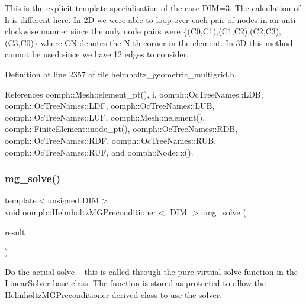 This is the explicit template specialisation of the case D\+IM=3. The calculation of h is different here. In 2D we were able to loop over each pair of nodes in an anti-\/clockwise manner since the only node pairs were \{(C0,C1),(C1,C2),(C2,C3),(C3,C0)\} where CN denotes the N-\/th corner in the element. In 3D this method cannot be used since we have 12 edges to consider. 

Definition at line 2357 of file helmholtz\+\_\+geometric\+\_\+multigrid.\+h.



References oomph\+::\+Mesh\+::element\+\_\+pt(), i, oomph\+::\+Oc\+Tree\+Names\+::\+L\+DB, oomph\+::\+Oc\+Tree\+Names\+::\+L\+DF, oomph\+::\+Oc\+Tree\+Names\+::\+L\+UB, oomph\+::\+Oc\+Tree\+Names\+::\+L\+UF, oomph\+::\+Mesh\+::nelement(), oomph\+::\+Finite\+Element\+::node\+\_\+pt(), oomph\+::\+Oc\+Tree\+Names\+::\+R\+DB, oomph\+::\+Oc\+Tree\+Names\+::\+R\+DF, oomph\+::\+Oc\+Tree\+Names\+::\+R\+UB, oomph\+::\+Oc\+Tree\+Names\+::\+R\+UF, and oomph\+::\+Node\+::x().

\mbox{\label{classoomph_1_1HelmholtzMGPreconditioner_aedd9102297d40354bd8d769ca2c343cb}} 
\subsubsection{\texorpdfstring{mg\+\_\+solve()}{mg\_solve()}}
{\footnotesize\ttfamily template$<$unsigned D\+IM$>$ \\
void \hyperlink{classoomph_1_1HelmholtzMGPreconditioner}{oomph\+::\+Helmholtz\+M\+G\+Preconditioner}$<$ D\+IM $>$\+::mg\+\_\+solve (\begin{DoxyParamCaption}\item[{\hyperlink{classoomph_1_1Vector}{Vector}$<$ \hyperlink{classoomph_1_1DoubleVector}{Double\+Vector} $>$ \&}]{result }\end{DoxyParamCaption})\hspace{0.3cm}{\ttfamily [private]}}



Do the actual solve -- this is called through the pure virtual solve function in the \hyperlink{classoomph_1_1LinearSolver}{Linear\+Solver} base class. The function is stored as protected to allow the \hyperlink{classoomph_1_1HelmholtzMGPreconditioner}{Helmholtz\+M\+G\+Preconditioner} derived class to use the solver. 

